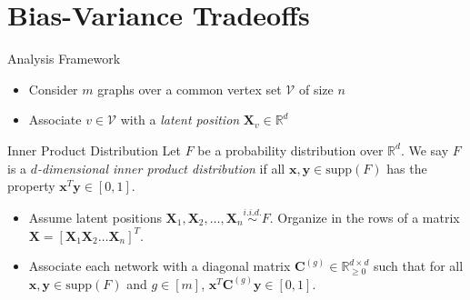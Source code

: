 \documentclass[handout]{beamer}
\newcommand{\bvar}[1]{\mathbf{#1}}
\begin{document}
\section{Bias-Variance Tradeoffs}

\begin{frame}{Analysis Framework}
    \begin{itemize}
        \item Consider $m$ graphs over a common vertex set $\mathcal{V}$ of size $n$ 
        \item Associate $v\in\mathcal{V}$ with a \textit{latent position} $\bvar{X}_v\in\mathbb{R}^d$
    \end{itemize}\pause
    \begin{block}{Inner Product Distribution}
    Let $F$ be a probability distribution over $\mathbb{R}^d$. We say $F$ is a \textit{$d$-dimensional inner product distribution} if all $\bvar{x},\bvar{y}\in \text{supp}(F)$ has the property $\bvar{x}^T\bvar{y}\in[0,1]$. 
    \end{block}
    \begin{itemize}
        \item Assume latent positions $\bvar{X}_1, \bvar{X}_2,\ldots, \bvar{X}_n\overset{i.i.d.}{\sim} F$. Organize in the rows of a matrix $\bvar{X} = [\bvar{X}_1\bvar{X}_2 \dots \bvar{X}_n]^T$. \pause
        \item Associate each network with a diagonal matrix $\bvar{C}^{(g)}\in\mathbb{R}_{\geq 0}^{d\times d}$ such that for all $\bvar{x}, \bvar{y}\in\text{supp}(F)$ and $g\in[m]$, $\bvar{x}^T\bvar{C}^{(g)}\bvar{y} \in [0,1]$. 
    \end{itemize}
    
\end{frame}
\end{document}
